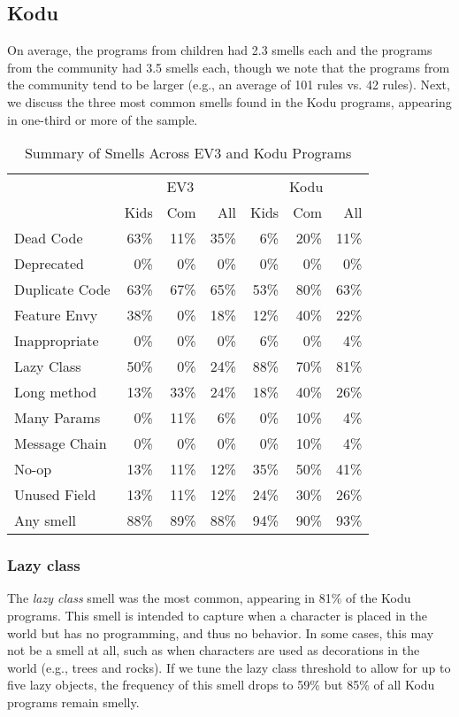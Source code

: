\documentclass[conference]{IEEEtran}
\begin{document}
\subsection{Kodu}
On average, the programs from children had 2.3 smells each and the programs from the community had 3.5 smells each, though we note that the programs from the community tend to be larger (e.g., an average of 101 rules vs. 42 rules). Next, we discuss the three most common smells found in the Kodu programs, appearing in one-third or more of the sample. 



\begin{table}
\caption{Summary of Smells Across EV3 and Kodu Programs \label{tab:smellsummary}}
\begin{center}
\begin{tabular}{| l || r r | r || r r | r||} \cline{2-7}
\multicolumn{1}{c||}{}&\multicolumn{3}{c||}{EV3}&\multicolumn{3}{c||}{Kodu}\\ \cline{2-7}
\multicolumn{1}{c||}{}& Kids & Com & All & Kids & Com & All \\ \hline
Dead Code&63\%&11\%&35\%&6\%&20\%&11\%\\
Deprecated  & 0\% & 0\%& 0\% & 0\%& 0\% & 0\%\\
Duplicate Code&63\%&67\%&65\%&53\%&80\%&63\%\\
Feature Envy&38\%&0\%&18\%&12\%&40\%&22\%\\
Inappropriate &0\%&0\%&0\%&6\%&0\%&4\%\\
Lazy Class&50\%&0\%&24\%&88\%&70\%&81\%\\
Long method&13\%&33\%&24\%&18\%&40\%&26\%\\
Many Params&0\%&11\%&6\%&0\%&10\%&4\%\\
Message Chain&0\%&0\%&0\%&0\%&10\%&4\%\\
No-op&13\%&11\%&12\%&35\%&50\%&41\%\\
Unused Field&13\%&11\%&12\%&24\%&30\%&26\%\\ \hline\hline
Any smell & 88\%&89\%&88\% & 94\%&90\%&93\% \\ \hline
\end{tabular}
\end{center}
\vspace{-12pt}
\end{table}

\subsubsection{Lazy class}
The \emph{lazy class} smell was the most common, appearing in 81\% of the Kodu programs. This smell is intended to capture when a character is placed in the world but has no programming, and thus no behavior. In some cases, this may not be a smell at all, such as when characters are used as decorations in the world (e.g., trees and rocks). If we tune the lazy class threshold to allow for up to five lazy objects, the frequency of this smell  drops to 59\% but 85\% of all Kodu programs remain smelly. 
\end{document}
